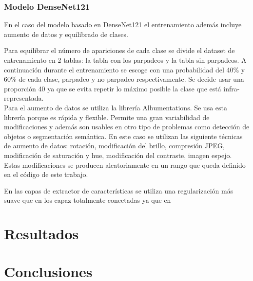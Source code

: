 \documentclass[12pt]{article}
\begin{document}
    \subsubsection{Modelo DenseNet121}
    En el caso del modelo basado en DenseNet121 el entrenamiento además incluye aumento de datos y equilibrado de
    clases.

    Para equilibrar el número de apariciones de cada clase se divide el dataset de entrenamiento en 2 tablas: la
    tabla con los parpadeos y la tabla sin parpadeos.
    A continuación durante el entrenamiento se escoge con una probabilidad del 40\% y 60\% de cada clase, parpadeo y
    no parpadeo respectivamente.
    Se decide usar una proporción 40 ya que se evita repetir lo máximo posible la clase que está infra-representada.
    \\

    Para el aumento de datos se utiliza la librería Albumentations\cite{albumentations}.
    Se usa esta librería porque es rápida y flexible.
    Permite una gran variabilidad de modificaciones y además son usables en otro tipo de problemas como detección de
    objetos o segmentación semántica.
    En este caso se utilizan las siguiente técnicas de aumento de datos: rotación, modificación del brillo,
    compresión JPEG, modificación de saturación y hue, modificación del contraste, imagen espejo.
    Estas modificaciones se producen aleatoriamente en un rango que queda definido en el código de este trabajo.



    En las capas de extractor de características se utiliza una regularización más suave que en los capaz totalmente
    conectadas ya que en


    \section{Resultados}


    \section{Conclusiones}

    \newpage
    
    
\end{document}
